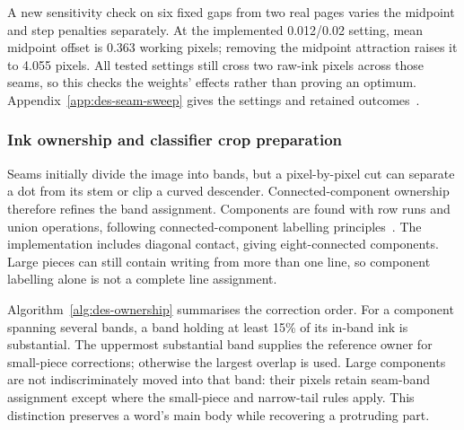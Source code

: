 A new sensitivity check on six fixed gaps from two real pages varies the midpoint and step penalties separately. At the implemented 0.012/0.02 setting, mean midpoint offset is 0.363 working pixels; removing the midpoint attraction raises it to 4.055 pixels. All tested settings still cross two raw-ink pixels across those seams, so this checks the weights' effects rather than proving an optimum. Appendix~\ref{app:des-seam-sweep} gives the settings and retained outcomes~\cite[\texttt{Evidence/coefficient\_sensitivity.json}]{brauneevidence2026}.

\subsubsection{Ink ownership and classifier crop preparation}
Seams initially divide the image into bands, but a pixel-by-pixel cut can separate a dot from its stem or clip a curved descender. Connected-component ownership therefore refines the band assignment. Components are found with row runs and union operations, following connected-component labelling principles~\cite[pp.~476--479]{rosenfeld1966}. The implementation includes diagonal contact, giving eight-connected components. Large pieces can still contain writing from more than one line, so component labelling alone is not a complete line assignment.

Algorithm~\ref{alg:des-ownership} summarises the correction order. For a component spanning several bands, a band holding at least 15\% of its in-band ink is substantial. The uppermost substantial band supplies the reference owner for small-piece corrections; otherwise the largest overlap is used. Large components are not indiscriminately moved into that band: their pixels retain seam-band assignment except where the small-piece and narrow-tail rules apply. This distinction preserves a word's main body while recovering a protruding part.~\cite[segment.py]{braunepipeline2026}


